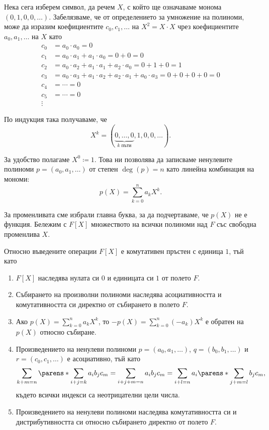 \documentclass{../../common/topic}
\begin{document}
Нека сега изберем символ, да речем \( X \), с който ще означаваме монома \( (0, 1, 0, 0, \ldots) \). Забелязваме, че от определението за умножение на полиноми, може да изразим коефициентите \( c_0, c_1, \ldots \) на \( X^2 = X \cdot X \) чрез коефициентите \( a_0, a_1, \ldots \) на \( X \) като
\begin{align*}
  c_0 &= a_0 \cdot a_0 = 0 \\
  c_1 &= a_0 \cdot a_1 + a_1 \cdot a_0 = 0 + 0 = 0 \\
  c_2 &= a_0 \cdot a_2 + a_1 \cdot a_1 + a_2 \cdot a_0 = 0 + 1 + 0 = 1 \\
  c_3 &= a_0 \cdot a_3 + a_1 \cdot a_2 + a_2 \cdot a_1 + a_0 \cdot a_3 = 0 + 0 + 0 + 0 = 0 \\
  c_4 &= \cdots = 0 \\
  c_5 &= \cdots = 0 \\
  \vdots
\end{align*}

По индукция така получаваме, че
\begin{equation*}
  X^k = (\underbrace{0, \ldots, 0}_{k \text{ пъти}}, 1, 0, 0, \ldots).
\end{equation*}

За удобство полагаме \( X^0 \coloneqq 1 \). Това ни позволява да записваме ненулевите полиноми \( p = (a_0, a_1, \ldots) \) от степен \( \deg(p) = n \) като линейна комбинация на мономи:
\begin{equation*}
  p(X) = \sum_{k=0}^n a_k X^k.
\end{equation*}

За променливата сме избрали главна буква, за да подчертаваме, че \( p(X) \) не е функция. Бележим с \( F[X] \) множеството на всички полиноми над \( F \) със свободна променлива \( X \).

Относно въведените операции \( F[X] \) е комутативен пръстен с единица \( 1 \), тъй като
\begin{enumerate}
  \item \( F[X] \) наследява нулата си \( 0 \) и единицата си \( 1 \) от полето \( F \).
  \item Събирането на произволни полиноми наследява асоциативността и комутативността си директно от събирането в полето \( F \).
  \item Ако \( p(X) = \sum_{k=0}^n a_k X^k \), то \( -p(X) = \sum_{k=0}^n (-a_k) X^k \) е обратен на \( p(X) \) относно събиране.
  \item Произведението на ненулеви полиноми \( p = (a_0, a_1, \ldots) \), \( q = (b_0, b_1, \ldots) \) и \( r = (c_0, c_1, \ldots) \) е асоциативно, тъй като
  \begin{equation*}
    \sum_{k+m=n} \parens*{\sum_{i+j=k} a_i b_j } c_m
    =
    \sum_{i+j+m=n} a_i b_j c_m
    =
    \sum_{i+l=n} a_i \parens*{ \sum_{j+m=l} b_j c_m },
  \end{equation*}
  където всички индекси са неотрицателни цели числа.
  \item Произведението на ненулеви полиноми наследява комутативността си и дистрибутивността си относно събирането директно от полето \( F \).
\end{enumerate}
\end{document}
